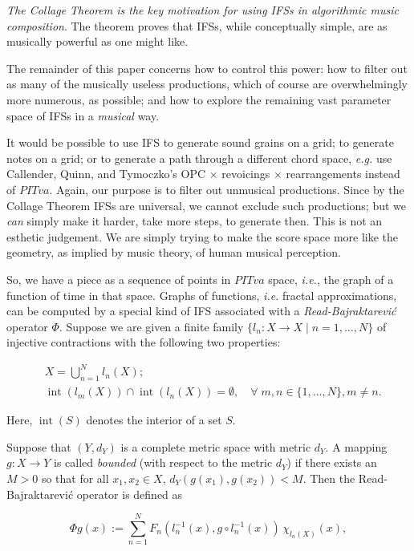 \documentclass[english,11pt,letterpaper,onecolumn]{scrartcl}
\numberwithin{equation}{section}
\newcommand{\Int}{\mathop{\mathrm{int}}}
\newcommand{\be}{\begin{equation}}
\newcommand{\ee}{\end{equation}}
\begin{document}
\textit{The Collage Theorem is the key motivation for using IFSs in
algorithmic music composition}. The theorem proves that IFSs, while
conceptually simple, are as musically powerful as one might like.

The remainder of this paper concerns how to control this power: how to
filter out as many of the musically useless productions, which of course are
overwhelmingly more numerous, as possible; and how to explore the
remaining vast parameter space of IFSs in a \textit{musical} way.

It would be possible to use IFS to generate sound grains on a grid; to
generate notes on a grid; or to generate a path through a different chord
space, \textit{e.g.} use Callender, Quinn, and Tymoczko's OPC $\times$
revoicings $\times$ rearrangements instead of $PITva$. Again, our purpose is
to filter out unmusical productions. Since by the Collage Theorem IFSs are
universal, we cannot exclude such productions; but we \textit{can} simply make
it harder, take more steps, to generate then. This is not an esthetic
judgement. We are simply trying to make the score space more like the
geometry, as implied by music theory, of human musical perception.

So, we have a piece as a sequence of points in $PITva$ space, \textit{i.e.},
the graph of a function of time in that space. Graphs of functions,
\textit{i.e.} fractal approximations, can be computed by a special kind of IFS
associated with a \textit{Read-Bajraktarevi\'c} operator $\Phi$. Suppose we
are given a finite family $\{l_n : X\to X \mid n = 1, \ldots, N\}$ of
injective contractions with the following two properties:

\begin{align}
&X = \bigcup_{n=1}^N l_n(X);\label{union}\\
&\Int (l_m(X))\cap \Int(l_n(X)) = \emptyset, \quad\forall\;m, n\in \{1,\ldots,
N\}, m\neq n.\label{partition}
\end{align}

\noindent Here, $\Int (S)$ denotes the interior of a set $S$.

Suppose that $(Y,d_Y)$ is a complete metric space with metric $d_Y$. A mapping
$g:X\to Y$ is called \emph{bounded} (with respect to the metric $d_Y$) if
there exists an $M> 0$ so that for all $x_1, x_2\in X$, $d_Y(g(x_1),g(x_2)) <
M$. Then the Read-Bajraktarevi\'c operator is defined as

\be\label{RB}
\Phi g (x) := \sum\limits_{n=1}^N F_n (l_n^{-1} (x), g\circ l_n^{-1}
(x))\,\chi_{l_n(X)}(x),
\ee
\end{document}
